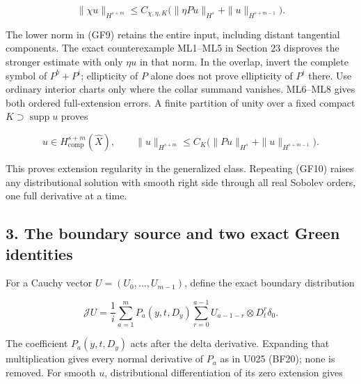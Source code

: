 \documentclass[
  11pt,
]{article}
\makeatletter
\let\ReaderOriginalAnchorStart\hyper@anchorstart
\let\ReaderOriginalAnchorEnd\hyper@anchorend
\let\ReaderPendingAliases\@empty
\def\ReaderArmAliases#1{\gdef\ReaderPendingAliases{#1}}
\def\hyper@anchorstart#1{\ReaderIfNativeAnchorTF{#1}{\ReaderPendingAliases\global\let\ReaderPendingAliases\@empty}{}\ReaderOriginalAnchorStart{#1}}
\makeatother
\begin{document}
\[
 \|\chi u\|_{H^{s+m}}
 \leq C_{\chi,\eta,K}
 \bigl(\|\eta Pu\|_{H^s}+\|u\|_{H^{s+m-1}}\bigr).
 \tag{GF9}
\]

The lower norm in (GF9) retains the entire input, including distant
tangential components. The exact counterexample ML1--ML5 in Section 23
disproves the stronger estimate with only \(\eta u\) in that norm. In
the overlap, invert the complete symbol of \(P^b+P^i\); ellipticity of
\(P\) alone does not prove ellipticity of \(P^i\) there. Use ordinary
interior charts only where the collar summand vanishes. ML6--ML8 gives
both ordered full-extension errors. A finite partition of unity over a
fixed compact \(K\supset\operatorname{supp}u\) proves

\[
 u\in H^{s+m}_{\mathrm{comp}}(\widehat X),
 \qquad
 \|u\|_{H^{s+m}}
 \leq C_K\bigl(\|Pu\|_{H^s}+\|u\|_{H^{s+m-1}}\bigr).
 \tag{GF10}
\]

This proves extension regularity in the generalized class. Repeating
(GF10) raises any distributional solution with smooth right side through
all real Sobolev orders, one full derivative at a time.

\ReaderArmAliases{\ReaderOriginalAnchorStart{AN03-GCF-003}\ReaderOriginalAnchorEnd\begingroup\expandafter\def\csname @currentHref\endcsname{AN03-GCF-003}\label{AN03-GCF-003}\endgroup\ReaderOriginalAnchorStart{3-the-boundary-source-and-two-exact-green-identities}\ReaderOriginalAnchorEnd\begingroup\expandafter\def\csname @currentHref\endcsname{3-the-boundary-source-and-two-exact-green-identities}\label{3-the-boundary-source-and-two-exact-green-identities}\endgroup\ReaderOriginalAnchorStart{the-boundary-source-and-two-exact-green-identities}\ReaderOriginalAnchorEnd}
\subsection{3. The boundary source and two exact Green
identities}\label{the-boundary-source-and-two-exact-green-identities}

For a Cauchy vector \(U=(U_0,\ldots,U_{m-1})\), define the exact
boundary distribution

\[
 \mathcal JU=\frac1i\sum_{a=1}^{m}P_a(y,t,D_y)
       \sum_{r=0}^{a-1}U_{a-1-r}\otimes D_t^r\delta_0.
 \tag{GF11}
\]

The coefficient \(P_a(y,t,D_y)\) acts after the delta derivative.
Expanding that multiplication gives every normal derivative of \(P_a\)
as in U025 (BF20); none is removed. For smooth \(u\), distributional
differentiation of its zero extension gives
\end{document}
